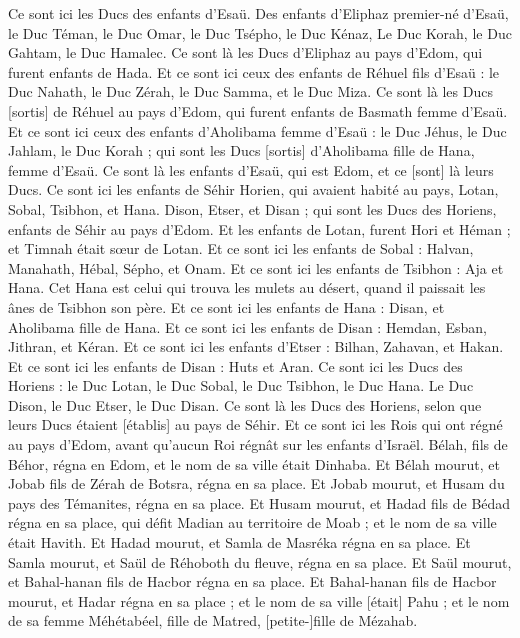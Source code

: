 \begin{multicols}{2}
Ce sont ici les Ducs des enfants d'Esaü. Des enfants d'Eliphaz premier-né d'Esaü, le Duc Téman, le Duc Omar, le Duc Tsépho, le Duc Kénaz,
Le Duc Korah, le Duc Gahtam, le Duc Hamalec. Ce sont là les Ducs d'Eliphaz au pays d'Edom, qui furent enfants de Hada.
Et ce sont ici ceux des enfants de Réhuel fils d'Esaü : le Duc Nahath, le Duc Zérah, le Duc Samma, et le Duc Miza. Ce sont là les Ducs [sortis] de Réhuel au pays d'Edom, qui furent enfants de Basmath femme d'Esaü.
Et ce sont ici ceux des enfants d'Aholibama femme d'Esaü : le Duc Jéhus, le Duc Jahlam, le Duc Korah ; qui sont les Ducs [sortis] d'Aholibama fille de Hana, femme d'Esaü.
Ce sont là les enfants d'Esaü, qui est Edom, et ce [sont] là leurs Ducs.
Ce sont ici les enfants de Séhir Horien, qui avaient habité au pays, Lotan, Sobal, Tsibhon, et Hana.
Dison, Etser, et Disan ; qui sont les Ducs des Horiens, enfants de Séhir au pays d'Edom.
Et les enfants de Lotan, furent Hori et Héman ; et Timnah était sœur de Lotan.
Et ce sont ici les enfants de Sobal : Halvan, Manahath, Hébal, Sépho, et Onam.
Et ce sont ici les enfants de Tsibhon : Aja et Hana. Cet Hana est celui qui trouva les mulets au désert, quand il paissait les ânes de Tsibhon son père.
Et ce sont ici les enfants de Hana : Disan, et Aholibama fille de Hana.
Et ce sont ici les enfants de Disan : Hemdan, Esban, Jithran, et Kéran.
Et ce sont ici les enfants d'Etser : Bilhan, Zahavan, et Hakan.
Et ce sont ici les enfants de Disan : Huts et Aran.
Ce sont ici les Ducs des Horiens : le Duc Lotan, le Duc Sobal, le Duc Tsibhon, le Duc Hana.
Le Duc Dison, le Duc Etser, le Duc Disan. Ce sont là les Ducs des Horiens, selon que leurs Ducs étaient [établis] au pays de Séhir.
Et ce sont ici les Rois qui ont régné au pays d'Edom, avant qu'aucun Roi régnât sur les enfants d'Israël.
Bélah, fils de Béhor, régna en Edom, et le nom de sa ville était Dinhaba.
Et Bélah mourut, et Jobab fils de Zérah de Botsra, régna en sa place.
Et Jobab mourut, et Husam du pays des Témanites, régna en sa place.
Et Husam mourut, et Hadad fils de Bédad régna en sa place, qui défit Madian au territoire de Moab ; et le nom de sa ville était Havith.
Et Hadad mourut, et Samla de Masréka régna en sa place.
Et Samla mourut, et Saül de Réhoboth du fleuve, régna en sa place.
Et Saül mourut, et Bahal-hanan fils de Hacbor régna en sa place.
Et Bahal-hanan fils de Hacbor mourut, et Hadar régna en sa place ; et le nom de sa ville [était] Pahu ; et le nom de sa femme Méhétabéel, fille de Matred, [petite-]fille de Mézahab.

\end{multicols}
